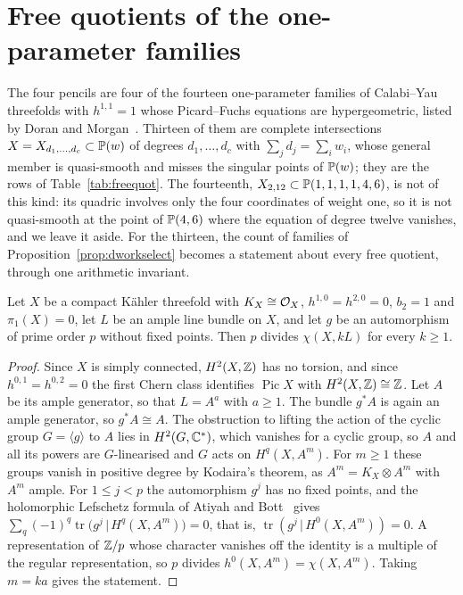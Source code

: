 \section{Free quotients of the one-parameter families}\label{sec:freequot}

The four pencils are four of the fourteen one-parameter families of
Calabi--Yau threefolds with $h^{1,1}=1$ whose Picard--Fuchs equations are
hypergeometric, listed by Doran and Morgan~\cite{DM06}. Thirteen of them are
complete intersections $X=X_{d_1,\dots,d_c}\subset\mathbb{P}(w)$ of degrees
$d_1,\dots,d_c$ with $\sum_jd_j=\sum_iw_i$, whose general member is
quasi-smooth and misses the singular points of $\mathbb{P}(w)$; they are the rows
of Table~\ref{tab:freequot}. The fourteenth, $X_{2,12}\subset
\mathbb{P}(1,1,1,1,4,6)$, is not of this kind: its quadric involves only the four
coordinates of weight one, so it is not quasi-smooth at the point of
$\mathbb{P}(4,6)$ where the equation of degree twelve vanishes, and we leave it
aside. For the thirteen, the count of families of
Proposition~\ref{prop:dworkselect} becomes a statement about every free
quotient, through one arithmetic invariant.

\begin{lemma}\label{lem:freeprime}
Let $X$ be a compact K\"ahler threefold with $K_X\cong\mathcal{O}_X$,
$h^{1,0}=h^{2,0}=0$, $b_2=1$ and $\pi_1(X)=0$, let $L$ be an ample line
bundle on $X$, and let $g$ be an automorphism of prime order $p$ without
fixed points. Then $p$ divides $\chi(X,kL)$ for every $k\ge1$.
\end{lemma}

\begin{proof}
Since $X$ is simply connected, $H^2(X,\mathbb{Z})$ has no torsion, and since
$h^{0,1}=h^{0,2}=0$ the first Chern class identifies $\operatorname{Pic}X$
with $H^2(X,\mathbb{Z})\cong\mathbb{Z}$. Let $A$ be its ample generator, so that $L=A^a$
with $a\ge1$. The bundle $g^*A$ is again an ample generator, so
$g^*A\cong A$. The obstruction to lifting the action of the cyclic group
$G=\langle g\rangle$ to $A$ lies in $H^2(G,\mathbb{C}^*)$, which vanishes for a
cyclic group, so $A$ and all its powers are $G$-linearised and $G$ acts on
$H^q(X,A^m)$. For $m\ge1$ these groups vanish in positive degree by
Kodaira's theorem, as $A^m=K_X\otimes A^m$ with $A^m$ ample. For $1\le
j<p$ the automorphism $g^j$ has no fixed points, and the holomorphic
Lefschetz formula of Atiyah and Bott~\cite{AB68} gives
$\sum_q(-1)^q\operatorname{tr}\big(g^j\,|\,H^q(X,A^m)\big)=0$, that is,
$\operatorname{tr}(g^j\,|\,H^0(X,A^m))=0$. A representation of $\mathbb{Z}/p$ whose
character vanishes off the identity is a multiple of the regular
representation, so $p$ divides $h^0(X,A^m)=\chi(X,A^m)$. Taking $m=ka$
gives the statement.
\end{proof}

